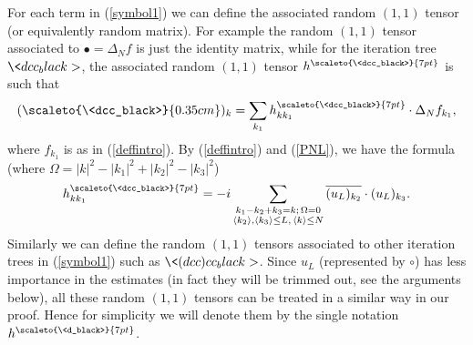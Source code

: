 \documentclass[11 pt,reqno]{amsart}
\theoremstyle{definition}
\theoremstyle{remark}
\numberwithin{equation}{section}
\begin{document}
For each term in (\ref{symbol1}) we can define the associated random $(1,1)$ tensor (or equivalently random matrix). For example the random $(1,1)$ tensor associated to $\bullet=\Delta_N f$ is just the identity matrix, while for the iteration tree $\<dcc_black>$, the associated random $(1,1)$ tensor $h^{\scaleto{\<dcc_black>}{7pt}}$ is such that
\begin{equation}\label{tensorterm1}
(\scaleto{\<dcc_black>}{0.35cm})_k = \sum_{k_1}h^{\scaleto{\<dcc_black>}{7pt}}_{kk_1} \cdot\Delta_N f_{k_1},
\end{equation} where $f_{k_1}$ is as in (\ref{deffintro}). By (\ref{deffintro}) and (\ref{PNL}), we have the formula (where $\Omega=|k|^2-|k_1|^2+|k_2|^2-|k_3|^2$)
\begin{equation}\label{tensorterm11}
h^{\scaleto{\<dcc_black>}{7pt}}_{kk_1} = 
-i \sum_{\substack{k_1-k_2 +k_3=k;\,\Omega=0\\\langle k_2\rangle, \langle k_3\rangle\leq L,\,\langle k\rangle \leq N}}\overline{(u_L)_{k_2}}\cdot (u_L)_{k_3}.
\end{equation}
Similarly we can define the random $(1,1)$ tensors associated to other iteration trees in (\ref{symbol1}) such as $\<(dcc)cc_black>$. Since $u_L$ (represented by $\circ$) has less importance in the estimates (in fact they will be trimmed out, see the arguments below), all these random $(1,1)$ tensors can be treated in a similar way in our proof. Hence for simplicity we will denote them by the single notation $h^{\scaleto{\<d_black>}{7pt}}$.
\end{document}
